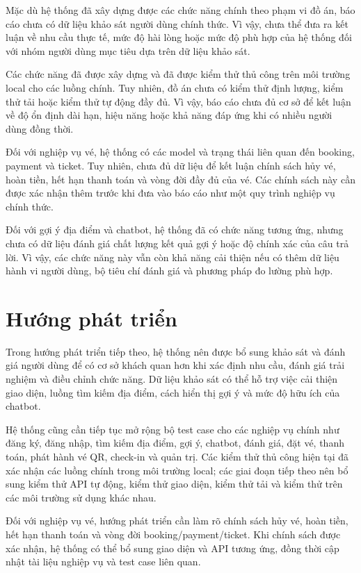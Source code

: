 \documentclass[../DoAn.tex]{subfiles}
\begin{document}
Mặc dù hệ thống đã xây dựng được các chức năng chính theo phạm vi đồ án, báo cáo chưa có dữ liệu khảo sát người dùng chính thức. Vì vậy, chưa thể đưa ra kết luận về nhu cầu thực tế, mức độ hài lòng hoặc mức độ phù hợp của hệ thống đối với nhóm người dùng mục tiêu dựa trên dữ liệu khảo sát.

Các chức năng đã được xây dựng và đã được kiểm thử thủ công trên môi trường local cho các luồng chính. Tuy nhiên, đồ án chưa có kiểm thử định lượng, kiểm thử tải hoặc kiểm thử tự động đầy đủ. Vì vậy, báo cáo chưa đủ cơ sở để kết luận về độ ổn định dài hạn, hiệu năng hoặc khả năng đáp ứng khi có nhiều người dùng đồng thời.

Đối với nghiệp vụ vé, hệ thống có các model và trạng thái liên quan đến booking, payment và ticket. Tuy nhiên, chưa đủ dữ liệu để kết luận chính sách hủy vé, hoàn tiền, hết hạn thanh toán và vòng đời đầy đủ của vé. Các chính sách này cần được xác nhận thêm trước khi đưa vào báo cáo như một quy trình nghiệp vụ chính thức.

Đối với gợi ý địa điểm và chatbot, hệ thống đã có chức năng tương ứng, nhưng chưa có dữ liệu đánh giá chất lượng kết quả gợi ý hoặc độ chính xác của câu trả lời. Vì vậy, các chức năng này vẫn còn khả năng cải thiện nếu có thêm dữ liệu hành vi người dùng, bộ tiêu chí đánh giá và phương pháp đo lường phù hợp.

\section{Hướng phát triển}

Trong hướng phát triển tiếp theo, hệ thống nên được bổ sung khảo sát và đánh giá người dùng để có cơ sở khách quan hơn khi xác định nhu cầu, đánh giá trải nghiệm và điều chỉnh chức năng. Dữ liệu khảo sát có thể hỗ trợ việc cải thiện giao diện, luồng tìm kiếm địa điểm, cách hiển thị gợi ý và mức độ hữu ích của chatbot.

Hệ thống cũng cần tiếp tục mở rộng bộ test case cho các nghiệp vụ chính như đăng ký, đăng nhập, tìm kiếm địa điểm, gợi ý, chatbot, đánh giá, đặt vé, thanh toán, phát hành vé QR, check-in và quản trị. Các kiểm thử thủ công hiện tại đã xác nhận các luồng chính trong môi trường local; các giai đoạn tiếp theo nên bổ sung kiểm thử API tự động, kiểm thử giao diện, kiểm thử tải và kiểm thử trên các môi trường sử dụng khác nhau.

Đối với nghiệp vụ vé, hướng phát triển cần làm rõ chính sách hủy vé, hoàn tiền, hết hạn thanh toán và vòng đời booking/payment/ticket. Khi chính sách được xác nhận, hệ thống có thể bổ sung giao diện và API tương ứng, đồng thời cập nhật tài liệu nghiệp vụ và test case liên quan.
\end{document}
